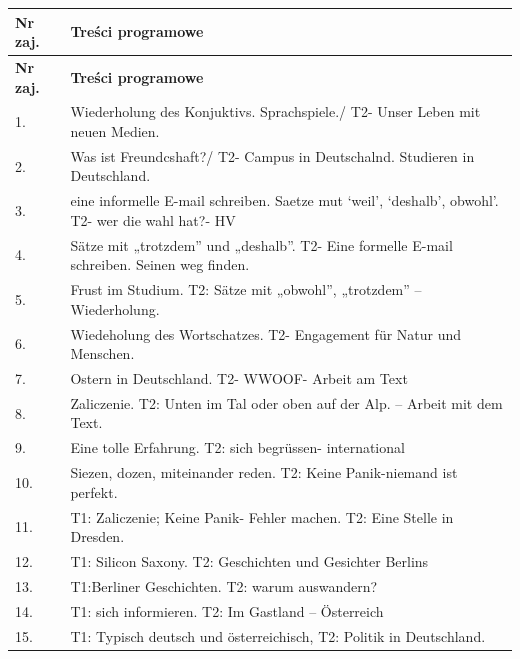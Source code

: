\documentclass[12pt, a4paper]{article}
\newcommand{\thdrule}{\noalign{\global\setlength{\extrarowheight}{0pt}}}
\newcommand{\thdend}{\noalign{\global\setlength{\extrarowheight}{3pt}}}
\begin{document}
{\scriptsize
\begin{longtable}{m{1.5cm}m{14.5cm}}
\thdrule\toprule
\rowcolor{pjatkRed} {\color{white}\textbf{Nr zaj.}} & {\color{white}\textbf{Treści programowe}} \\
\midrule\thdend
\endfirsthead
\thdrule\toprule
\rowcolor{pjatkRed} {\color{white}\textbf{Nr zaj.}} & {\color{white}\textbf{Treści programowe}} \\
\midrule\thdend
\endhead
  \rowcolor{tableRowLight} 1. & Wiederholung des Konjuktivs. Sprachspiele./ T2- Unser Leben mit neuen Medien. \\
  \rowcolor{tableRowAlt} 2. & Was ist Freundcshaft?/ T2- Campus in Deutschalnd. Studieren in Deutschland. \\
  \rowcolor{tableRowLight} 3. & eine informelle E-mail schreiben. Saetze mut ‘weil’, ‘deshalb’, obwohl’. T2- wer die wahl hat?- HV \\
  \rowcolor{tableRowAlt} 4. & Sätze mit „trotzdem” und „deshalb”. T2- Eine formelle E-mail schreiben. Seinen weg finden. \\
  \rowcolor{tableRowLight} 5. & Frust im Studium. T2: Sätze mit „obwohl”, „trotzdem” – Wiederholung. \\
  \rowcolor{tableRowAlt} 6. & Wiedeholung des Wortschatzes. T2- Engagement für Natur und Menschen. \\
  \rowcolor{tableRowLight} 7. & Ostern in Deutschland. T2- WWOOF- Arbeit am Text \\
  \rowcolor{tableRowAlt} 8. & Zaliczenie. T2: Unten im Tal oder oben auf der Alp. – Arbeit mit dem Text. \\
  \rowcolor{tableRowLight} 9. & Eine tolle Erfahrung. T2: sich begrüssen- international \\
  \rowcolor{tableRowAlt} 10. & Siezen, dozen, miteinander reden. T2: Keine Panik-niemand ist perfekt. \\
  \rowcolor{tableRowLight} 11. & T1: Zaliczenie; Keine Panik- Fehler machen. T2: Eine Stelle in Dresden. \\
  \rowcolor{tableRowAlt} 12. & T1: Silicon Saxony. T2: Geschichten und Gesichter Berlins \\
  \rowcolor{tableRowLight} 13. & T1:Berliner Geschichten. T2: warum auswandern? \\
  \rowcolor{tableRowAlt} 14. & T1: sich informieren. T2: Im Gastland – Österreich \\
  \rowcolor{tableRowLight} 15. & T1: Typisch deutsch und österreichisch, T2: Politik in Deutschland. \\
\bottomrule
\end{longtable}}
\end{document}
